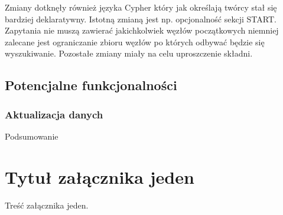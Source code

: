 \documentclass[brudnopis]{xmgr}
\begin{document}
Zmiany dotknęły również języka Cypher który jak określają twórcy stał się bardziej deklaratywny. Istotną zmianą jest np. opcjonalność sekcji START. Zapytania nie muszą zawierać jakichkolwiek węzłów początkowych niemniej zalecane jest ograniczanie zbioru węzłów po których odbywać będzie się wyszukiwanie. Pozostałe zmiany miały na celu uproszczenie składni.

\section{Potencjalne funkcjonalności}

\subsection{Aktualizacja danych}

\summary
Podsumowanie

\appendix
\chapter{Tytuł załącznika jeden}

Treść załącznika jeden.




\listoftables

\listoffigures

\oswiadczenie
\end{document}
